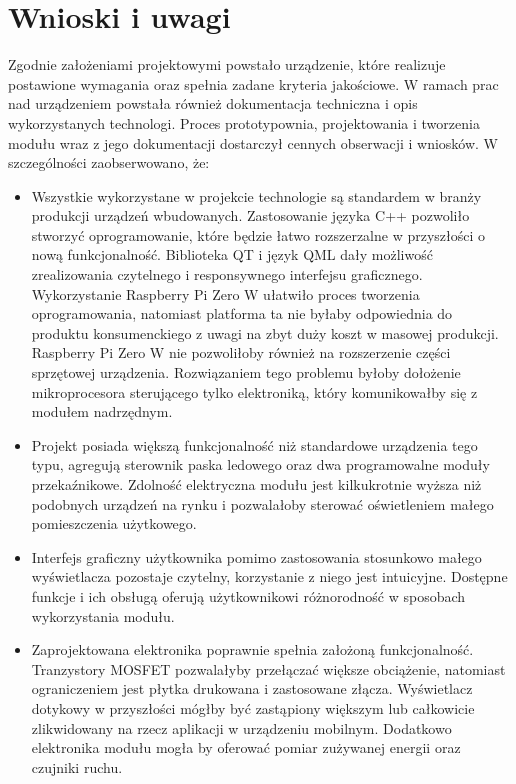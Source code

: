 \documentclass[12pt, eng, twoside, openany, final]{mgr}
\begin{document}
\chapter{Wnioski i uwagi}
Zgodnie założeniami projektowymi powstało urządzenie, które realizuje postawione wymagania oraz spełnia zadane kryteria jakościowe. W ramach prac nad urządzeniem powstała również dokumentacja techniczna i opis wykorzystanych technologi. Proces prototypownia, projektowania i tworzenia modułu wraz z jego dokumentacji dostarczył cennych obserwacji i wniosków. W szczególności zaobserwowano, że:
\begin{itemize}

\item Wszystkie wykorzystane w projekcie technologie są standardem w branży produkcji urządzeń wbudowanych. Zastosowanie języka C++ pozwoliło stworzyć oprogramowanie, które będzie łatwo rozszerzalne w przyszłości o nową funkcjonalność. Biblioteka QT i język QML dały możliwość zrealizowania czytelnego i responsywnego interfejsu graficznego. Wykorzystanie Raspberry Pi Zero W ułatwiło proces tworzenia oprogramowania, natomiast platforma ta nie byłaby odpowiednia do produktu konsumenckiego z uwagi na zbyt duży koszt w masowej produkcji. Raspberry Pi Zero W nie pozwoliłoby również na rozszerzenie części sprzętowej urządzenia. Rozwiązaniem tego problemu byłoby dołożenie mikroprocesora sterującego tylko elektroniką, który komunikowałby się z modułem nadrzędnym.

\item Projekt posiada większą funkcjonalność niż standardowe urządzenia tego typu, agregują sterownik paska ledowego oraz dwa programowalne moduły przekaźnikowe. Zdolność elektryczna modułu jest kilkukrotnie wyższa niż podobnych urządzeń na rynku i pozwalałoby sterować oświetleniem małego pomieszczenia użytkowego.

\item Interfejs graficzny użytkownika pomimo zastosowania stosunkowo małego wyświetlacza pozostaje czytelny, korzystanie z niego jest intuicyjne. Dostępne funkcje i ich obsługą oferują użytkownikowi różnorodność w sposobach wykorzystania modułu. 

\item Zaprojektowana elektronika poprawnie spełnia założoną funkcjonalność. Tranzystory MOSFET pozwalałyby przełączać większe obciążenie, natomiast ograniczeniem jest płytka drukowana i zastosowane złącza. Wyświetlacz dotykowy w przyszłości mógłby być zastąpiony większym lub całkowicie zlikwidowany na rzecz aplikacji w urządzeniu mobilnym. Dodatkowo elektronika modułu mogła by oferować pomiar zużywanej energii oraz czujniki ruchu.


\end{itemize}
\end{document}
